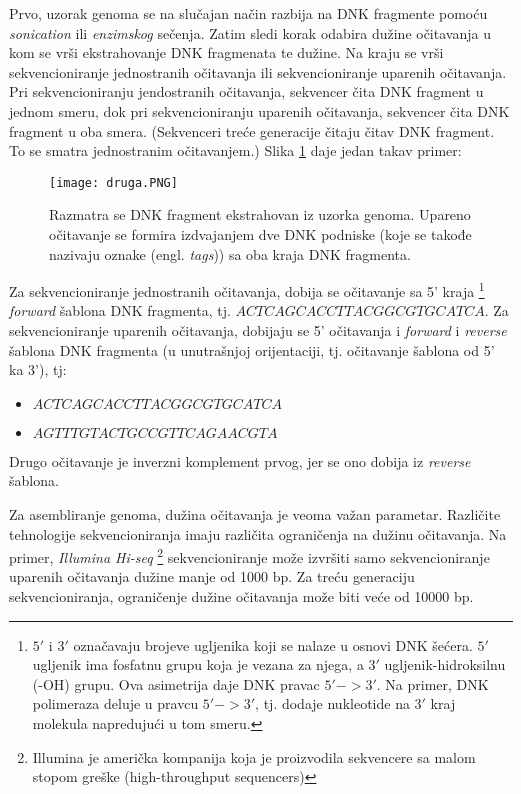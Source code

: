 \documentclass[12pt,oneside]{memoir}
\begin{document}
Prvo, uzorak genoma se na slučajan način razbija na DNK fragmente pomoću \textit{sonication} ili \textit{enzimskog} sečenja. Zatim sledi korak odabira dužine očitavanja u kom se vrši ekstrahovanje DNK fragmenata te dužine. Na kraju se vrši sekvencioniranje jednostranih očitavanja ili sekvencioniranje uparenih očitavanja. Pri sekvencioniranju jendostranih očitavanja, sekvencer čita DNK fragment u jednom smeru, dok pri sekvencioniranju uparenih očitavanja, sekvencer čita DNK fragment u oba smera. (Sekvenceri treće generacije čitaju čitav DNK fragment. To se smatra jednostranim očitavanjem.) Slika \ref{fig:2} daje jedan takav primer:

\newpage

\begin{figure}[!ht]
  \centering
  \texttt{[image: druga.PNG]}
  \caption{Razmatra se DNK fragment ekstrahovan iz uzorka genoma. Upareno očitavanje se formira izdvajanjem dve DNK podniske (koje se takođe nazivaju oznake (engl. \textit{tags})) sa oba kraja DNK fragmenta.}
  \label{fig:2}
\end{figure}

Za sekvencioniranje jednostranih očitavanja, dobija se očitavanje sa 5' kraja \footnote{$5'$ i $3'$ označavaju brojeve ugljenika koji se nalaze u osnovi DNK šećera. $5'$ ugljenik ima fosfatnu grupu koja je vezana za njega, a $3'$ ugljenik-hidroksilnu (-OH) grupu. Ova asimetrija daje DNK pravac $5' -> 3'$. Na primer, DNK polimeraza deluje u pravcu $5' -> 3'$, tj. dodaje nukleotide na $3'$ kraj molekula napredujući u tom smeru.} \textit{forward} šablona DNK fragmenta, tj. $ACTCAGCACCTTACGGCGTGCATCA$. Za sekvencioniranje uparenih očitavanja, dobijaju se 5' očitavanja i \textit{forward} i \textit{reverse} šablona DNK fragmenta (u unutrašnjoj orijentaciji, tj. očitavanje šablona od 5' ka 3'), tj:

\begin{itemize}
    \item {$ACTCAGCACCTTACGGCGTGCATCA$}
    \item {$AGTTTGTACTGCCGTTCAGAACGTA$}
\end{itemize}

Drugo očitavanje je inverzni komplement prvog, jer se ono dobija iz \textit{reverse} šablona.

Za asembliranje genoma, dužina očitavanja je veoma važan parametar. Različite tehnologije sekvencioniranja imaju različita ograničenja na dužinu očitavanja. Na primer, \textit{Illumina Hi-seq} \footnote{Illumina je američka kompanija koja je proizvodila sekvencere sa malom stopom greške (high-throughput sequencers)} sekvencioniranje može izvršiti samo sekvencioniranje uparenih očitavanja dužine manje od 1000 bp. Za treću generaciju sekvencioniranja, ograničenje dužine očitavanja može biti veće od 10000 bp.
\end{document}
